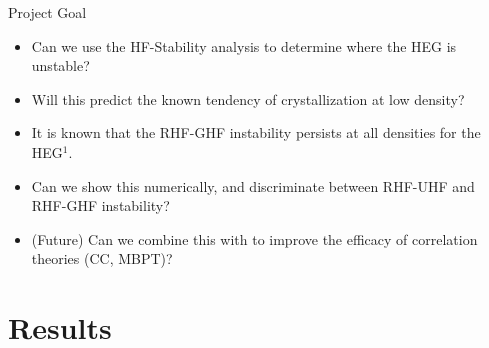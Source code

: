 \documentclass[10pt]{beamer}
\begin{document}
{{{{{{{


{%
\begin{frame}{Project Goal}
	\begin{itemize}[<+->]
		\item{Can we use the HF-Stability analysis to determine where the HEG is unstable?}
		\item{Will this predict the known tendency of crystallization at low density?}
		\item{It is known that the RHF-GHF instability persists at all densities for the HEG$^1$.}
		\item{Can we show this numerically, and discriminate between RHF-UHF and RHF-GHF instability?}
		\item{(Future) Can we combine this with to improve the efficacy of correlation theories (CC, MBPT)?}
	\end{itemize}
\end{frame}



\section{Results}

}}}}}}}}
\end{document}
